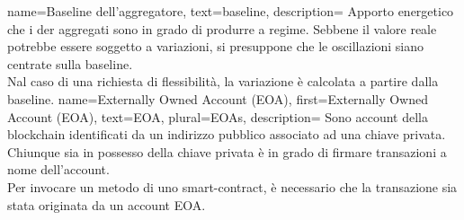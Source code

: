 {
    name={Baseline dell'aggregatore},
    text={baseline},
    description={
            Apporto energetico che i \gls{der} aggregati sono in grado di produrre a regime.
            Sebbene il valore reale potrebbe essere soggetto a variazioni, si presuppone che le oscillazioni siano centrate sulla baseline. \\
            Nal caso di una richiesta di flessibilità, la variazione è calcolata a partire dalla baseline.
        }
}
{
    name={Externally Owned Account (EOA)},
    first={Externally Owned Account (EOA)},
    text={EOA},
    plural={EOAs},
    description={
            Sono account della blockchain identificati da un indirizzo pubblico associato ad una chiave privata.
            Chiunque sia in possesso della chiave privata è in grado di firmare transazioni a nome dell'account. \\
            Per invocare un metodo di uno \gls{smart-contract}, è necessario che la transazione sia stata originata da un account EOA.
        }
}